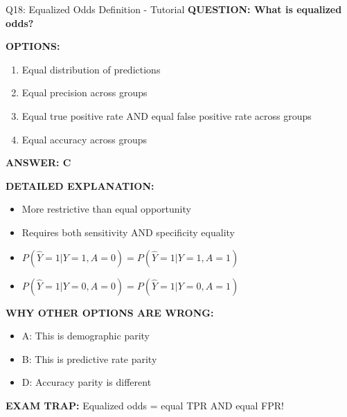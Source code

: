 \documentclass[8pt]{beamer}
\begin{document}
	\begin{frame}{Q18: Equalized Odds Definition - Tutorial}
		\fontsize{6.5}{7.5}\selectfont
		\textbf{QUESTION: What is equalized odds?}
		
		\vspace{0.1cm}
		\textbf{OPTIONS:}
		\begin{enumerate}
			\item Equal distribution of predictions
			\item Equal precision across groups
			\item Equal true positive rate AND equal false positive rate across groups
			\item Equal accuracy across groups
		\end{enumerate}
		
		\vspace{0.1cm}
		\textcolor{myblue}{\textbf{ANSWER: C}}
		
		\vspace{0.1cm}
		\textbf{DETAILED EXPLANATION:}
		\begin{itemize}
			\item More restrictive than equal opportunity
			\item Requires both sensitivity AND specificity equality
			\item $P(\hat{Y}=1|Y=1,A=0) = P(\hat{Y}=1|Y=1,A=1)$
			\item $P(\hat{Y}=1|Y=0,A=0) = P(\hat{Y}=1|Y=0,A=1)$
		\end{itemize}
		
		\vspace{0.1cm}
		\textcolor{myred}{\textbf{WHY OTHER OPTIONS ARE WRONG:}}
		\begin{itemize}
			\item \textcolor{myred}{A:} This is demographic parity
			\item \textcolor{myred}{B:} This is predictive rate parity
			\item \textcolor{myred}{D:} Accuracy parity is different
		\end{itemize}
		
		\textcolor{myred}{\textbf{EXAM TRAP:}} Equalized odds = \textcolor{myblue}{equal TPR AND equal FPR}!
	\end{frame}
	
\end{document}
